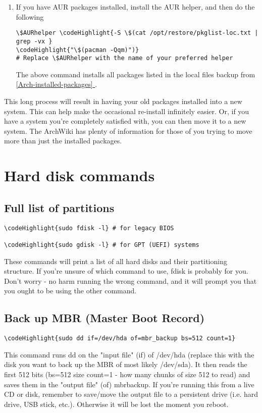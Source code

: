 \documentclass[12pt,a4paper]{article}
\begin{document}
\begin{enumerate}
\begin{Verbatim}[commandchars=\\\{\}]
\codeHighlight{pacman -S --needed \$(cat /opt/restore/pkglist-off.txt)}
\end{Verbatim}
\item If you have AUR packages installed, install the AUR helper, and then do the following
\begin{Verbatim}[commandchars=\\\{\}]
\$AURhelper \codeHighlight{-S \$(cat /opt/restore/pkglist-loc.txt | grep -vx }
\codeHighlight{"\$(pacman -Qqm)")}
# Replace \$AURhelper with the name of your preferred helper
\end{Verbatim}
The above command installs all packages listed in the local files backup from \hyperref[Arch-installed-packages]{\ref*{Arch-installed-packages} }.
\end{enumerate}
This long process will result in having your old packages installed into a new system. This can help make the occasional re-install infinitely easier. Or, if you have a system you're completely satisfied with, you can then move it to a new system. The ArchWiki has plenty of information for those of you trying to move more than just the installed packages.

\section{Hard disk commands}
\label{Hard drive commands}
\subsection{Full list of partitions}
\begin{Verbatim}[commandchars=\\\{\}]
\codeHighlight{sudo fdisk -l} # for legacy BIOS

\codeHighlight{sudo gdisk -l} # for GPT (UEFI) systems
\end{Verbatim}
These commands will print a list of all hard disks and their partitioning structure. If you're unsure of which command to use, fdisk is probably for you. Don't worry - no harm running the wrong command, and it will prompt you that you ought to be using the other command.

\subsection{Back up MBR (Master Boot Record)}
\begin{Verbatim}[commandchars=\\\{\}]
\codeHighlight{sudo dd if=/dev/hda of=mbr_backup bs=512 count=1}
\end{Verbatim}
This command runs dd on the "input file" (if) of /dev/hda (replace this with the disk you want to back up the MBR of \- most likely /dev/sda). It then reads the first 512 bits (bs=512 \- size count=1 - how many chunks of size 512 to read) and saves them in the "output file" (of) mbr\textunderscore backup. If you're running this from a live CD or disk, remember to save/move the output file to a persistent drive (i.e. hard drive, USB stick, etc.). Otherwise it will be lost the moment you reboot.
\end{document}
